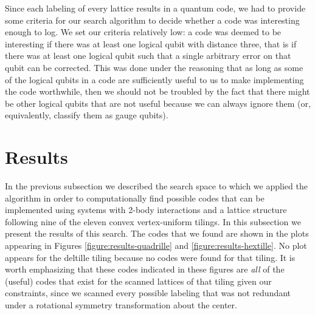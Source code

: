 \documentclass[12pt]{amsbook}
\theoremstyle{plain}
\theoremstyle{definition}
\theoremstyle{remark}
\begin{document}
Since each labeling of every lattice results in a quantum code, we had to provide some criteria for our search algorithm to decide whether a code was interesting enough to log.  We set our criteria relatively low:  a code was deemed to be interesting if there was at least one logical qubit with distance three, that is if there was at least one logical qubit such that a single arbitrary error on that qubit can be corrected.  This was done under the reasoning that as long as some of the logical qubits in a code are sufficiently useful to us to make implementing the code worthwhile, then we should not be troubled by the fact that there might be other logical qubits that are not useful because we can always ignore them (or, equivalently, classify them as gauge qubits).
\section{Results} \label{sec:results}

In the previous subsection we described the search space to which we applied the algorithm in order to computationally find possible codes that can be implemented using systems with 2-body interactions and a lattice structure following nine of the eleven convex vertex-uniform tilings.  In this subsection we present the results of this search.  The codes that we found are shown in the plots appearing in Figures \ref{figure:results-quadrille} and \ref{figure:results-hextille}.  No plot appears for the deltille tiling because no codes were found for that tiling.  It is worth emphasizing that these codes indicated in these figures are \emph{all} of the (useful) codes that exist for the scanned lattices of that tiling given our constraints, since we scanned every possible labeling that was not redundant under a rotational symmetry transformation about the center.
\end{document}
